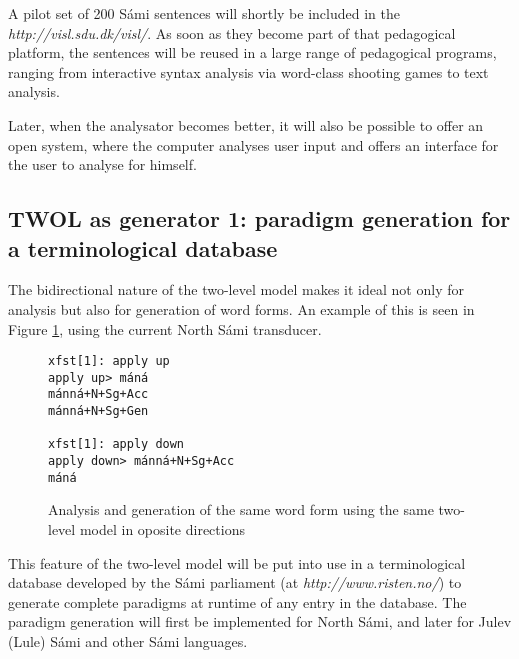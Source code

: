 \documentclass[a4paper,english]{article}
\begin{document}
A pilot set of 200 Sámi sentences will shortly be included in the \textit{http://visl.sdu.dk/visl/}. As soon as they become part of that pedagogical platform, the sentences will be reused in a large range of pedagogical programs, ranging from interactive syntax analysis via word-class shooting games to text analysis.


Later, when the analysator becomes better, it will also be possible to offer an open system, where the computer analyses user input and offers an interface for the user to analyse for himself. 

\subsection{TWOL as generator 1: paradigm generation for a terminological database}\label{term}

The bidirectional nature of the two-level model makes it ideal not only for analysis but also for generation of word forms. An example of this is seen in Figure \ref{anagen}, using the current North Sámi transducer.

\begin{figure}[htb]
\caption{Analysis and generation of the same word form using the same two-level model in oposite directions}
\begin{center}
\begin{verbatim}
xfst[1]: apply up
apply up> máná
mánná+N+Sg+Acc
mánná+N+Sg+Gen

xfst[1]: apply down
apply down> mánná+N+Sg+Acc
máná
\end{verbatim}
\end{center}
\label{anagen}
\end{figure}

This feature of the two-level model will be put into use in a terminological database developed by the Sámi parliament (at \textit{http://www.risten.no/}) to generate complete paradigms at runtime of any entry in the database. The paradigm generation will first be implemented for North Sámi, and later for Julev (Lule) Sámi and other Sámi languages.
\end{document}
